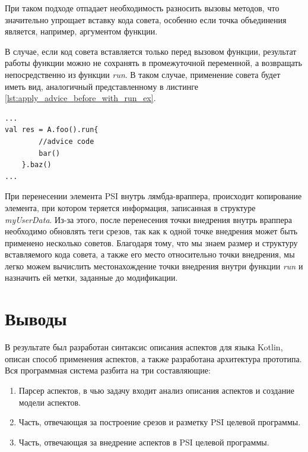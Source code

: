 При таком подходе отпадает необходимость разносить вызовы методов, что
значительно упрощает вставку кода совета, особенно если точка объединения
является, например, аргументом функции.

В случае, если код совета вставляется только перед вызовом функции, результат
работы функции можно не сохранять в промежуточной переменной, а возвращать
непосредственно из функции \textit{run}.
В таком случае, применение совета будет иметь вид, аналогичный представленному
в листинге \ref{lst:apply_advice_before_with_run_ex}.
\begin{lstlisting}[label=lst:apply_advice_before_with_run_ex,
    caption={Пример внедрения кода совета после точки объединения с использованием функции run}]
...
val res = A.foo().run{
        //advice code
        bar()
    }.baz()
...
\end{lstlisting}

При перенесении элемента PSI внутрь лямбда-враппера, происходит копирование
элемента, при котором теряется информация, записанная в структуре
\textit{myUserData}.
Из-за этого, после перенесения точки внедрения внутрь враппера необходимо
обновлять теги срезов, так как к одной точке внедрения может быть применено
несколько советов.
Благодаря тому, что мы знаем размер и структуру вставляемого кода совета, а
также его место относительно точки внедрения, мы легко можем вычислить
местонахождение точки внедрения внутри функции \textit{run} и назначить ей
метки, заданные до модификации.
\section{Выводы}
\label{sec:design_conclusion}
В результате был разработан синтаксис описания аспектов для языка Kotlin,
описан способ применения аспектов, а также разработана архитектура прототипа.
Вся программная система разбита на три составляющие:
\begin{enumerate}
	\item Парсер аспектов, в чью задачу входит анализ описания аспектов и создание модели аспектов.
	\item Часть, отвечающая за построение срезов и разметку PSI целевой программы.
	\item Часть, отвечающая за внедрение аспектов в PSI целевой программы.
\end{enumerate}
